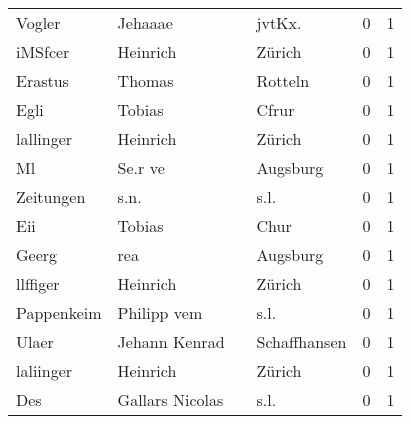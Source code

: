 \documentclass[10pt,a4paper,landscape]{article}
\begin{document}
\begin{longtable}{llllrr}
                   Vogler &                            Jehaaae &             &                                     jvtKx.  &          0 &         1 \\
                  iMSfcer &                           Heinrich &             &                                      Zürich &          0 &         1 \\
                  Erastus &                             Thomas &             &                                     Rotteln &          0 &         1 \\
                     Egli &                             Tobias &             &                                       Cfrur &          0 &         1 \\
                lallinger &                           Heinrich &             &                                      Zürich &          0 &         1 \\
                       Ml &                            Se.r ve &             &                                    Augsburg &          0 &         1 \\
                Zeitungen &                               s.n. &             &                                        s.l. &          0 &         1 \\
                      Eii &                             Tobias &             &                                        Chur &          0 &         1 \\
                    Geerg &                                rea &             &                                    Augsburg &          0 &         1 \\
                 llffiger &                           Heinrich &             &                                      Zürich &          0 &         1 \\
               Pappenkeim &                        Philipp vem &             &                                        s.l. &          0 &         1 \\
                    Ulaer &                      Jehann Kenrad &             &                                Schaffhansen &          0 &         1 \\
                laliinger &                           Heinrich &             &                                      Zürich &          0 &         1 \\
                      Des &                    Gallars Nicolas &             &                                        s.l. &          0 &         1 \\

\end{longtable}
\end{document}
